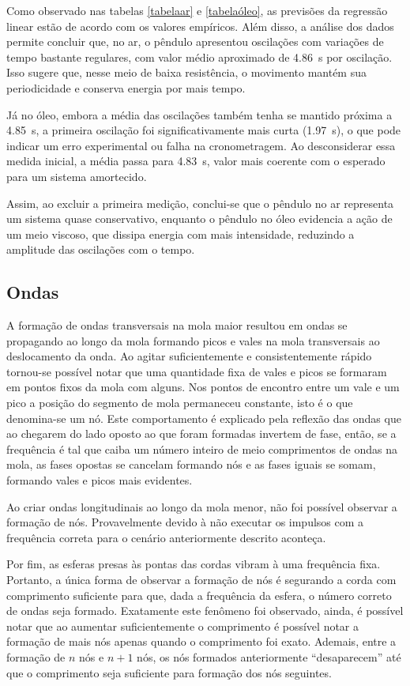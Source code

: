 Como observado nas tabelas \ref{tabelaar} e \ref{tabelaóleo}, as previsões da regressão linear estão de acordo com os valores empíricos. Além disso, a análise dos dados permite concluir que, no ar, o pêndulo apresentou oscilações com variações de tempo bastante regulares, com valor médio aproximado de \qty{4,86}{s} por oscilação. Isso sugere que, nesse meio de baixa resistência, o movimento mantém sua periodicidade e conserva energia por mais tempo.

Já no óleo, embora a média das oscilações também tenha se mantido próxima a \qty{4,85}{s}, a primeira oscilação foi significativamente mais curta (\qty{1,97}{s}), o que pode indicar um erro experimental ou falha na cronometragem. Ao desconsiderar essa medida inicial, a média passa para \qty{4,83}{s}, valor mais coerente com o esperado para um sistema amortecido.

Assim, ao excluir a primeira medição, conclui-se que o pêndulo no ar representa um sistema quase conservativo, enquanto o pêndulo no óleo evidencia a ação de um meio viscoso, que dissipa energia com mais intensidade, reduzindo a amplitude das oscilações com o tempo.

\subsection{Ondas}
A formação de ondas transversais na mola maior resultou em ondas se propagando ao longo da mola formando picos e vales na mola transversais ao deslocamento da onda. Ao agitar suficientemente e consistentemente rápido tornou-se possível notar que uma quantidade fixa de vales e picos se formaram em pontos fixos da mola com alguns. Nos pontos de encontro entre um vale e um pico a posição do segmento de mola permaneceu constante, isto é o que denomina-se um nó. Este comportamento é explicado pela reflexão das ondas que ao chegarem do lado oposto ao que foram formadas invertem de fase, então, se a frequência é tal que caiba um número inteiro de meio comprimentos de ondas na mola, as fases opostas se cancelam formando nós e as fases iguais se somam, formando vales e picos mais evidentes. 

Ao criar ondas longitudinais ao longo da mola menor, não foi possível observar a formação de nós. Provavelmente devido à não executar os impulsos com a frequência correta para o cenário anteriormente descrito aconteça. 
    
Por fim, as esferas presas às pontas das cordas vibram à uma frequência fixa. Portanto, a única forma de observar a formação de nós é segurando a corda com comprimento suficiente para que, dada a frequência da esfera, o número correto de ondas seja formado. Exatamente este fenômeno foi observado, ainda, é possível notar que ao aumentar suficientemente o comprimento é possível notar a formação de mais nós apenas quando o comprimento foi exato. Ademais, entre a formação de \(n\) nós e \(n+1\) nós, os nós formados anteriormente ``desaparecem'' até que o comprimento seja suficiente para formação dos nós seguintes.



